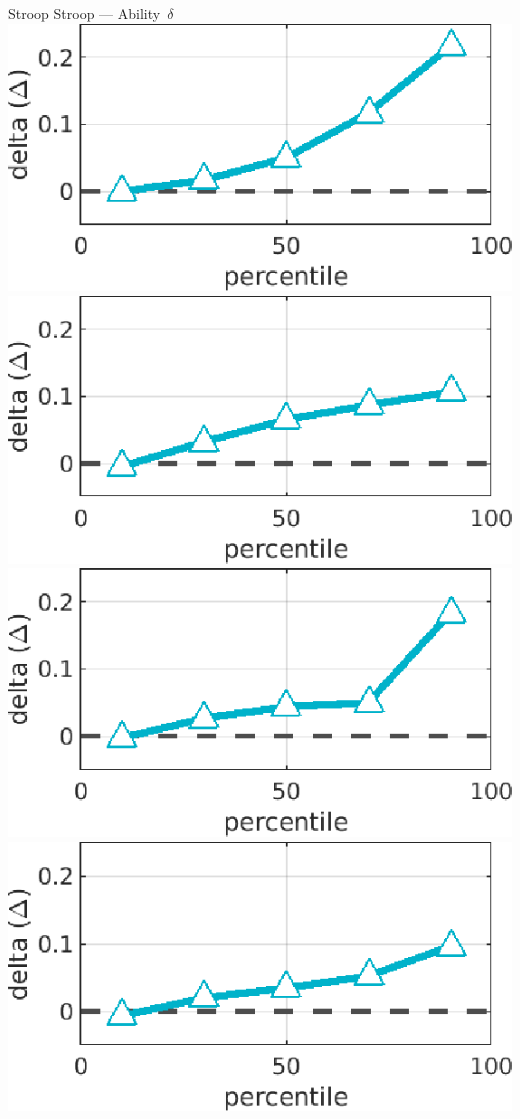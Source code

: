 \documentclass[aspectratio=169]{beamer}
\begin{document}
\begin{frame}[fragile]{Stroop Stroop --- Ability~$\delta$}
{\includegraphics[scale=.35]{d1.eps}}
{\includegraphics[scale=.35]{d2.eps}}
{\includegraphics[scale=.35]{d3.eps}}
{\includegraphics[scale=.35]{d4.eps}}

\end{frame}
\end{document}
